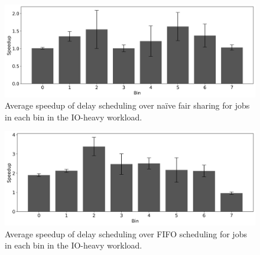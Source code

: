 \begin{figure}
  \centering
  \includegraphics[width=\linewidth]{figures/delay-fair-speedup.png}
  \caption{Average speedup of delay scheduling over na\"{i}ve fair sharing for jobs in each bin in the IO-heavy workload.}
  \label{fig:delay_vs_naive}
\end{figure}

\begin{figure}
  \centering
  \includegraphics[width=\linewidth]{figures/delay-fifo-speedup.png}
  \caption{Average speedup of delay scheduling over FIFO scheduling for jobs in each bin in the IO-heavy workload.}
  \label{fig:delay_vs_fifo}
\end{figure}

